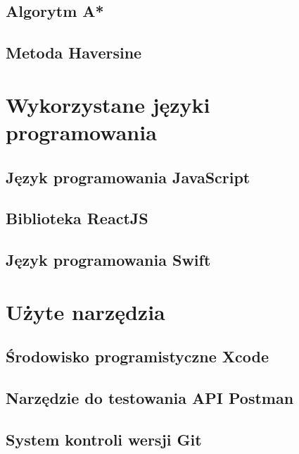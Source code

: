 \subsection{Algorytm A*}



\subsection{Metoda Haversine}



\section{Wykorzystane języki programowania}



\subsection{Język programowania JavaScript}



\subsection{Biblioteka ReactJS}



\subsection{Język programowania Swift}



\section{Użyte narzędzia}



\subsection{Środowisko programistyczne Xcode}



\subsection{Narzędzie do testowania API Postman}



\subsection{System kontroli wersji Git}

